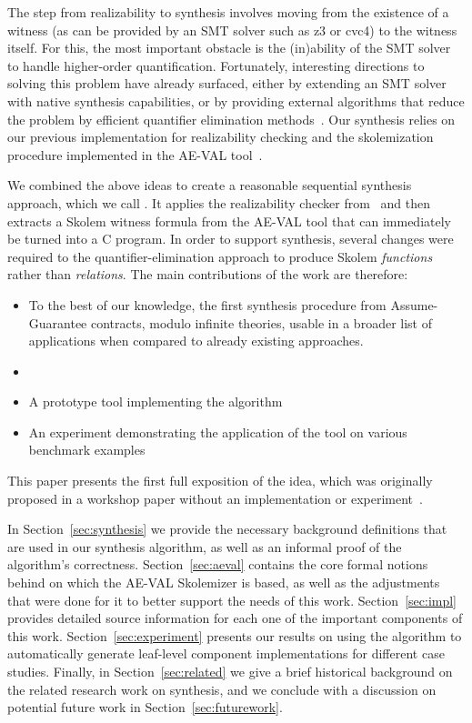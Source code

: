The step from realizability to synthesis involves moving from the existence of a witness (as can be provided by an SMT solver such as z3 or cvc4) to the witness itself.  For this, the most important obstacle is the (in)ability of the SMT solver to handle higher-order quantification. Fortunately, interesting directions to solving this problem have already surfaced, either by extending an SMT solver with native synthesis capabilities\cite{reynoldscounterexample}, or by providing external algorithms that reduce the problem by efficient quantifier elimination methods~\cite{fedyukovichae}.  Our synthesis relies on our previous implementation for realizability checking and the skolemization procedure implemented in the AE-VAL tool~\cite{fedyukovichae}.


We combined the above ideas to create a reasonable sequential synthesis
approach, which we call \toolname.  It applies the realizability checker from~\cite{Katis15:Realizability} and then extracts a Skolem witness formula from the AE-VAL tool that can immediately be turned into a C program.  In order to support synthesis, several changes were required to the quantifier-elimination approach to produce Skolem {\em functions} rather than {\em relations}.  The main contributions of the work are therefore:
\begin{itemize}
	\item To the best of our knowledge, the first synthesis procedure from
	Assume-Guarantee contracts, modulo infinite theories, usable in a broader
	list of applications when compared to already existing approaches.
	\item {}
	\item A prototype tool implementing the algorithm
	\item An experiment demonstrating the application of the tool on various benchmark examples
\end{itemize}

\noindent This paper presents the first full exposition of the idea, which was originally proposed in a workshop paper without an implementation or experiment~\cite{katis2016towards}.

In Section~\ref{sec:synthesis} we provide the necessary background
definitions that are used in our synthesis algorithm, as well as an informal
proof of the algorithm's correctness. Section~\ref{sec:aeval} contains the
core formal notions behind on which the AE-VAL Skolemizer is based, as well
as the adjustments that were done for it to better support the needs of this
work. Section~\ref{sec:impl} provides detailed
source information for each one of the important
components of this work. Section~\ref{sec:experiment} presents our results on
using the algorithm to automatically generate leaf-level component implementations for different case studies.
Finally, in Section~\ref{sec:related} we give a brief historical background on the related research work on synthesis, and we conclude with a discussion on potential future work in Section~\ref{sec:futurework}.

